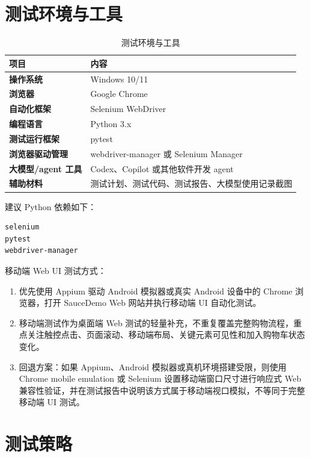 \documentclass[UTF8,a4paper,12pt]{ctexart}
\begin{document}
\section{测试环境与工具}

\begin{table}[htbp]
\centering
\caption{测试环境与工具}
\begin{tabularx}{\textwidth}{>{\bfseries}p{3.6cm}X}
\toprule
项目 & 内容 \\
\midrule
操作系统 & Windows 10/11 \\
浏览器 & Google Chrome \\
自动化框架 & Selenium WebDriver \\
编程语言 & Python 3.x \\
测试运行框架 & pytest \\
浏览器驱动管理 & webdriver-manager 或 Selenium Manager \\
大模型/agent 工具 & Codex、Copilot 或其他软件开发 agent \\
辅助材料 & 测试计划、测试代码、测试报告、大模型使用记录截图 \\
\bottomrule
\end{tabularx}
\end{table}

建议 Python 依赖如下：

\begin{lstlisting}
selenium
pytest
webdriver-manager
\end{lstlisting}

移动端 Web UI 测试方式：

\begin{enumerate}
  \item 优先使用 Appium 驱动 Android 模拟器或真实 Android 设备中的 Chrome 浏览器，打开 SauceDemo Web 网站并执行移动端 UI 自动化测试。
  \item 移动端测试作为桌面端 Web 测试的轻量补充，不重复覆盖完整购物流程，重点关注触控点击、页面滚动、移动端布局、关键元素可见性和加入购物车状态变化。
  \item 回退方案：如果 Appium、Android 模拟器或真机环境搭建受限，则使用 Chrome mobile emulation 或 Selenium 设置移动端窗口尺寸进行响应式 Web 兼容性验证，并在测试报告中说明该方式属于移动端视口模拟，不等同于完整移动端 UI 测试。
\end{enumerate}

\section{测试策略}
\end{document}
